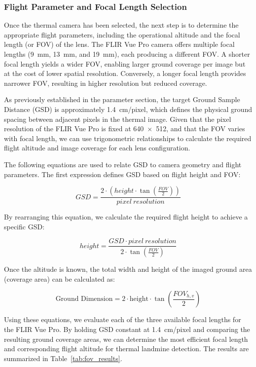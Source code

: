 \subsubsection{Flight Parameter and Focal Length Selection}

Once the thermal camera has been selected, the next step is to determine the appropriate flight parameters, including the operational altitude and the focal length (or FOV) of the lens. The FLIR Vue Pro camera offers multiple focal lengths (9~mm, 13~mm, and 19~mm), each producing a different FOV. A shorter focal length yields a wider FOV, enabling larger ground coverage per image but at the cost of lower spatial resolution. Conversely, a longer focal length provides narrower FOV, resulting in higher resolution but reduced coverage.

As previously established in the parameter section, the target Ground Sample Distance (GSD) is approximately 1.4~cm/pixel, which defines the physical ground spacing between adjacent pixels in the thermal image. Given that the pixel resolution of the FLIR Vue Pro is fixed at 640~×~512, and that the FOV varies with focal length, we can use trigonometric relationships to calculate the required flight altitude and image coverage for each lens configuration.

The following equations are used to relate GSD to camera geometry and flight parameters. The first expression defines GSD based on flight height and FOV:

\begin{equation}
    GSD = \frac{2 \cdot (height \cdot \tan(\frac{FOV}{2}))}{pixel\ resolution}
\end{equation}

By rearranging this equation, we calculate the required flight height to achieve a specific GSD:

\begin{equation}
    height = \frac{GSD \cdot pixel\ resolution}{2 \cdot \tan(\frac{FOV}{2})}
\end{equation}

Once the altitude is known, the total width and height of the imaged ground area (coverage area) can be calculated as:

\begin{equation}
    \text{Ground Dimension} = 2 \cdot \text{height} \cdot 
    \tan\left(\frac{FOV_{h,v}}{2}\right)
\end{equation}

Using these equations, we evaluate each of the three available focal lengths for the FLIR Vue Pro. By holding GSD constant at 1.4~cm/pixel and comparing the resulting ground coverage areas, we can determine the most efficient focal length and corresponding flight altitude for thermal landmine detection. The results are summarized in Table~\ref{tab:fov_results}. 

